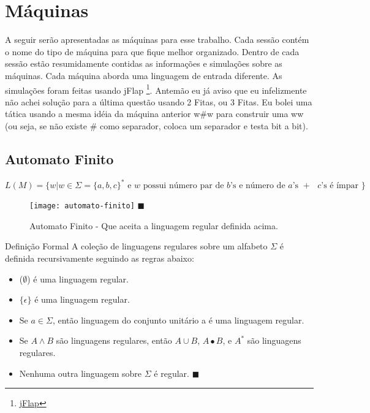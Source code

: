 \documentclass[12pt, a4paper]{article}
\begin{document}



\tableofcontents
\clearpage
\listoffigures
\clearpage



\section{Máquinas}

\qquad A seguir ser\~{a}o apresentadas as m\'{a}quinas para esse trabalho. Cada sess\~{a}o cont\'{e}m o nome do tipo de m\'{a}quina para que fique melhor organizado. Dentro de cada sess\~{a}o estão resumidamente contidas as informaç\~{o}es e simulaç\~{o}es sobre as m\'{a}quinas. Cada m\'{a}quina aborda uma linguagem de entrada diferente. As simulaç\~{o}es foram feitas usando jFlap \footnote{\href{http://www.cs.duke.edu/csed/jflap/}{jFlap}}. Antemão eu já aviso que eu infelizmente não achei solução para a última questão usando 2 Fitas, ou 3 Fitas. Eu bolei uma tática usando a mesma idéia da máquina anterior w\#w para construir uma ww (ou seja, se não existe \# como separador, coloca um separador e testa bit a bit). \pagebreak

\pagebreak
\subsection{Automato Finito}

$$ L(M)= \lbrace w \vert w \in \Sigma =  {\lbrace a,b,c \rbrace}^* \text{ e $w$ possui número par de $b$'s e número de $a$'s $+$ $c$'s é ímpar } \rbrace$$

\begin{figure}[ht]
  \centering
  \texttt{[image: automato-finito]} \flushright $\blacksquare$
  \caption{Automato Finito - Que aceita a linguagem regular definida acima.}
\end{figure}

\qquad Definição Formal
A coleção de linguagens regulares sobre um alfabeto $\Sigma$ é definida recursivamente seguindo as regras abaixo:

\begin{itemize}
  \item ($\emptyset$) é uma linguagem regular.
  \item $\lbrace \epsilon \rbrace$ é uma linguagem regular.
  \item Se $ a \in \Sigma$, então linguagem do conjunto unitário a é uma linguagem regular.
  \item Se $A \wedge B$ são linguagens regulares, então $A \cup B$, $A \bullet B$, e ${A}^*$ são linguagens regulares.
  \item Nenhuma outra linguagem sobre $\Sigma$ é regular. $\blacksquare$
\end{itemize}
\end{document}
